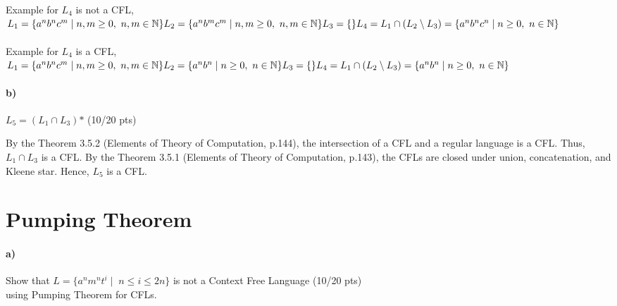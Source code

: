 \documentclass[a4paper,12pt]{article}
\begin{document}
\begin{tcolorbox}
Example for $L_4$ is not a CFL,\\
$
L_1 = \{a^nb^nc^m \mid n, m \geq 0, \ n, m \in \mathbb{N}\} \\
L_2 = \{a^nb^mc^m \mid n, m \geq 0, \ n, m \in \mathbb{N}\} \\
L_3 = \{\} \\
L_4 = L_1 \cap (L_2 \setminus L_3) = \{a^nb^nc^n \mid n \geq 0, \ n \in \mathbb{N}\}
$
\\\\
Example for $L_4$ is a CFL,\\
$
L_1 = \{a^nb^nc^m \mid n, m \geq 0, \ n, m \in \mathbb{N}\} \\
L_2 = \{a^nb^n \mid n \geq 0, \ n \in \mathbb{N}\} \\
L_3 = \{\} \\
L_4 = L_1 \cap (L_2 \setminus L_3) = \{a^nb^n \mid n \geq 0, \ n \in \mathbb{N}\}
$
\end{tcolorbox}

\paragraph{b)} $L_5 = (L_1 \cap L_3)\text{*}$ \hfill \small{(10/20 pts)} \\

\begin{tcolorbox}
By the Theorem 3.5.2 (Elements of Theory of Computation, p.144), the intersection of a CFL and a regular language is a CFL. Thus, $L_1 \cap L_3$ is a CFL. By the Theorem 3.5.1 (Elements of Theory of Computation, p.143), the CFLs are closed under union, concatenation, and Kleene star. Hence, $L_5$ is a CFL.
\end{tcolorbox}





\newpage
\section{Pumping Theorem \hfill {}}

\paragraph{a)} Show that $L=\{a^n m^n t^i \mid \; n\leq i \leq 2n\}$ is not a Context Free Language \hfill \small{(10/20 pts)} \\
using Pumping Theorem for CFLs. \\
\end{document}
